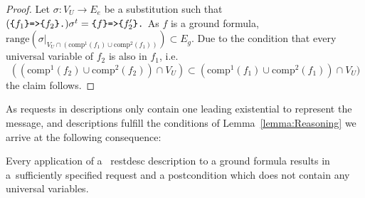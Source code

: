 \begin{proof}
 Let $\sigma:V_U\rightarrow E_e$ be a substitution %
 such that  $(\verb!{!f_1\verb!}=>{!f_2\verb!}.!)\sigma^t= \verb!{!f\verb!}=>{!f_2'\verb!}.!$ 
As $f$ is a ground formula, $\text{range}(\sigma|_{V_U\cap(\text{comp}^1(f_1)\cup \text{comp}^2(f_1))}) \subset E_g$. 
Due to the condition that every universal variable of $f_2$ 
is also in $f_1$, i.e. 
\[((\text{comp}^1(f_2)\cup \text{comp}^2(f_2))\cap V_U )\subset (\text{comp}^1(f_1)\cup \text{comp}^2(f_1))\cap V_U)\]
the claim follows. 
%
\end{proof}


As \http requests in \restdesc descriptions only contain
one leading existential to represent the \http message, and 
\restdesc descriptions 
fulfill the conditions of Lemma~\ref{lemma:Reasoning}
we arrive at the following consequence:

\begin{corollary}
\label{corollary}
Every application of a ~restdesc description to a ground formula results in a~sufficiently specified \http request 
and a postcondition which does not contain any universal variables.
\end{corollary}

